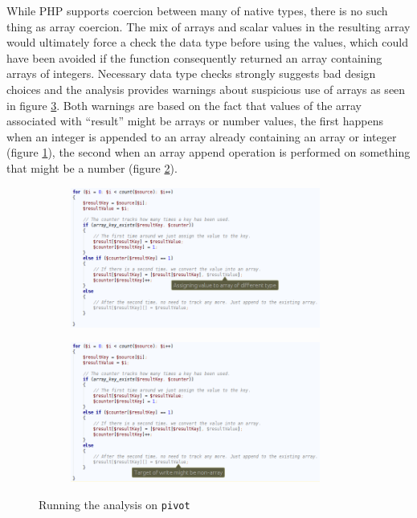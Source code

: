 While PHP supports coercion between many of native types, there is no such thing as array coercion. The mix of arrays and scalar values in the resulting array would ultimately force a check the data type before using the values, which could have been avoided if the function consequently returned an array containing arrays of integers. Necessary data type checks strongly suggests bad design choices and the analysis provides warnings about suspicious use of arrays as seen in figure \ref{fig:pivotScreenshot}. Both warnings are based on the fact that values of the array associated with ``result'' might be arrays or number values, the first happens when an integer is appended to an array already containing an array or integer (figure \ref{fig:pivotScreenshot1}), the second when an array append operation is performed on something that might be a number (figure \ref{fig:pivotScreenshot2}). 

\begin{figure}
\centering
\begin{subfigure}{\textwidth}
\centering
\includegraphics[width=0.9\textwidth]{chapters/caseStudy/newScreens/pivot1}
\label{fig:pivotScreenshot1}
\end{subfigure}
\begin{subfigure}{\textwidth}
\centering
\includegraphics[width=0.9\textwidth]{chapters/caseStudy/newScreens/pivot2}
\label{fig:pivotScreenshot2}
\end{subfigure}
\caption{Running the analysis on \texttt{pivot}}
\label{fig:pivotScreenshot}
\end{figure}

